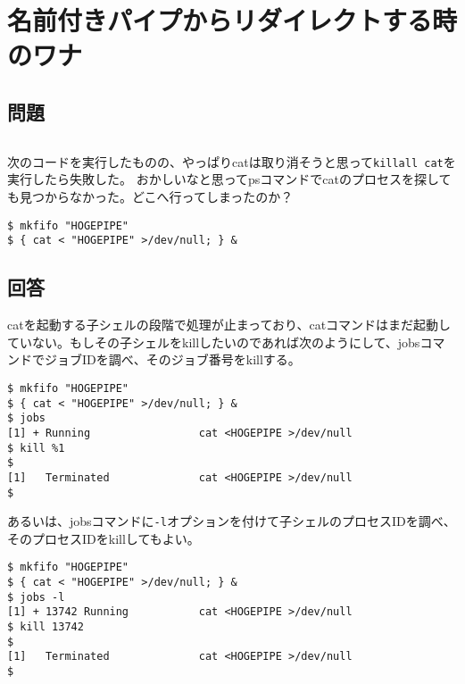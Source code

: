 \section{名前付きパイプからリダイレクトする時のワナ}

\subsection*{問題}
\noindent
$\!\!\!\!\!$
\begin{grshfboxit}{160.0mm}
	次のコードを実行したものの、やっぱりcatは取り消そうと思って\verb|killall cat|を実行したら失敗した。
	おかしいなと思ってpsコマンドでcatのプロセスを探しても見つからなかった。どこへ行ってしまったのか？
	\begin{screen}
		\verb|$ mkfifo "HOGEPIPE"| \return \\
		\verb|$ { cat < "HOGEPIPE" >/dev/null; } &| \return
	\end{screen}
\end{grshfboxit}

\subsection*{回答}
catを起動する子シェルの段階で処理が止まっており、catコマンドはまだ起動していない。もしその子シェルをkillしたいのであれば次のようにして、jobsコマンドでジョブIDを調べ、そのジョブ番号をkillする。

\begin{screen}
	\verb|$ mkfifo "HOGEPIPE"| \return \\
	\verb|$ { cat < "HOGEPIPE" >/dev/null; } &| \return \\
	\verb|$ jobs| \return \\
	\verb|[1] + Running                 cat <HOGEPIPE >/dev/null| \\
	\verb|$ kill %1| \return \\
	\verb|$ | \return \\
	\verb|[1]   Terminated              cat <HOGEPIPE >/dev/null| \\
	\verb|$ |
\end{screen}

あるいは、jobsコマンドに\verb|-l|オプションを付けて子シェルのプロセスIDを調べ、そのプロセスIDをkillしてもよい。

\begin{screen}
	\verb|$ mkfifo "HOGEPIPE"| \return \\
	\verb|$ { cat < "HOGEPIPE" >/dev/null; } &| \return \\
	\verb|$ jobs -l| \return \\
	\verb|[1] + 13742 Running           cat <HOGEPIPE >/dev/null| \\
	\verb|$ kill 13742| \return \\
	\verb|$ | \return \\
	\verb|[1]   Terminated              cat <HOGEPIPE >/dev/null| \\
	\verb|$ |
\end{screen}

